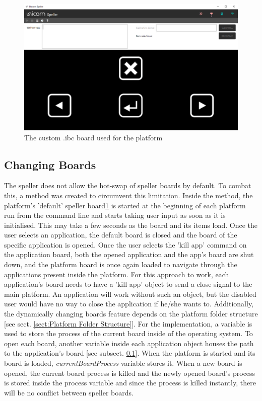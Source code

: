 \begin{figure}[H]
  \centering
  \includegraphics[width=1\textwidth]{Graphics/Platform Diet Board.png}
  \caption{The custom .ibc board used for the platform}
  \label{fig:default board}
\end{figure}


\subsection{Changing Boards}\label{subsect:Board Change}
The speller does not allow the hot-swap of speller boards by default. To combat this, a method was created to circumvent this limitation. Inside the method, the platform's 'default' speller board\ref{fig:default board} is started at the beginning of each platform run from the command line and starts taking user input as soon as it is initialised. This may take a few seconds as the board and its items load. Once the user selects an application, the default board is closed and the board of the specific application is opened. Once the user selects the 'kill app' command on the application board, both the opened application and the app's board are shut down, and the platform board is once again loaded to navigate through the applications present inside the platform. 
\vspace{\baselineskip}\newline
For this approach to work, each application's board needs to have a 'kill app' object to send a close signal to the main platform. An application will work without such an object, but the disabled user would have no way to close the application if he/she wants to. Additionally, the dynamically changing boards feature depends on the platform folder structure [see sect. \ref{sect:Platform Folder Structure}].
\vspace{\baselineskip}\newline
For the implementation, a variable is used to store the process of the current board inside of the operating system. To open each board, another variable inside each application object houses the path to the application's board [see subsect. \ref{subsect:Board Change}]. When the platform is started and its board is loaded, \textit{currentBoardProcess} variable stores it. When a new board is opened, the current board process is killed and the newly opened board's process is stored inside the process variable and since the process is killed instantly, there will be no conflict between speller boards. 


